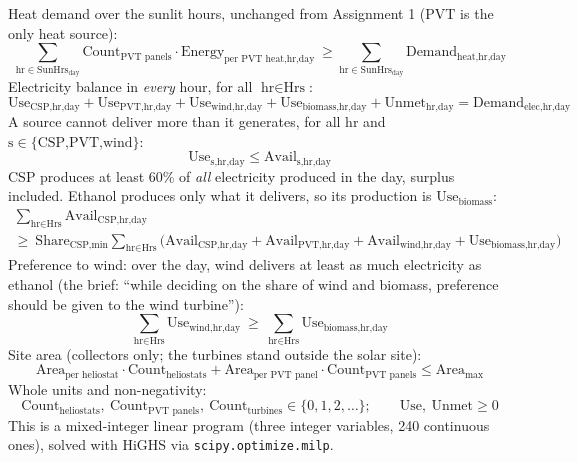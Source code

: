 \documentclass[11pt,a4paper]{article}
\newcommand{\T}[1]{\text{#1}}
\begin{document}
Heat demand over the sunlit hours, unchanged from Assignment 1 (PVT is the only heat source):
\begin{equation}\tag{C1}
\sum_{\T{hr}\in\T{SunHrs}_{\T{day}}}\T{Count}_{\T{PVT panels}}\cdot\T{Energy}_{\T{per PVT heat,hr,day}}\ \ge\sum_{\T{hr}\in\T{SunHrs}_{\T{day}}}\T{Demand}_{\T{heat,hr,day}}
\end{equation}
Electricity balance in \emph{every} hour, for all $\T{hr}\in\T{Hrs}$:
\begin{equation}\tag{C2}
\T{Use}_{\T{CSP,hr,day}}+\T{Use}_{\T{PVT,hr,day}}+\T{Use}_{\T{wind,hr,day}}+\T{Use}_{\T{biomass,hr,day}}+\T{Unmet}_{\T{hr,day}}=\T{Demand}_{\T{elec,hr,day}}
\end{equation}
A source cannot deliver more than it generates, for all $\T{hr}$ and $\T{s}\in\{\T{CSP,PVT,wind}\}$:
\begin{equation}\tag{C3}
\T{Use}_{\T{s,hr,day}}\le\T{Avail}_{\T{s,hr,day}}
\end{equation}
CSP produces at least 60\% of \emph{all} electricity produced in the day, surplus included. Ethanol produces only what it delivers, so its production is $\T{Use}_{\T{biomass}}$:
\begin{multline}\tag{C4}
\sum_{\T{hr}\in\T{Hrs}}\T{Avail}_{\T{CSP,hr,day}}\\
\ge\ \T{Share}_{\T{CSP,min}}\sum_{\T{hr}\in\T{Hrs}}\big(\T{Avail}_{\T{CSP,hr,day}}+\T{Avail}_{\T{PVT,hr,day}}+\T{Avail}_{\T{wind,hr,day}}+\T{Use}_{\T{biomass,hr,day}}\big)
\end{multline}
Preference to wind: over the day, wind delivers at least as much electricity as ethanol (the brief: ``while deciding on the share of wind and biomass, preference should be given to the wind turbine''):
\begin{equation}\tag{C5}
\sum_{\T{hr}\in\T{Hrs}}\T{Use}_{\T{wind,hr,day}}\ \ge\ \sum_{\T{hr}\in\T{Hrs}}\T{Use}_{\T{biomass,hr,day}}
\end{equation}
Site area (collectors only; the turbines stand outside the solar site):
\begin{equation}\tag{C6}
\T{Area}_{\T{per heliostat}}\cdot\T{Count}_{\T{heliostats}}+\T{Area}_{\T{per PVT panel}}\cdot\T{Count}_{\T{PVT panels}}\le\T{Area}_{\T{max}}
\end{equation}
Whole units and non-negativity:
\begin{equation}\tag{C7}
\T{Count}_{\T{heliostats}},\ \T{Count}_{\T{PVT panels}},\ \T{Count}_{\T{turbines}}\in\{0,1,2,\dots\};\qquad \T{Use},\ \T{Unmet}\ge0
\end{equation}
This is a mixed-integer linear program (three integer variables, 240 continuous ones), solved with HiGHS via \texttt{scipy.optimize.milp}.
\end{document}

